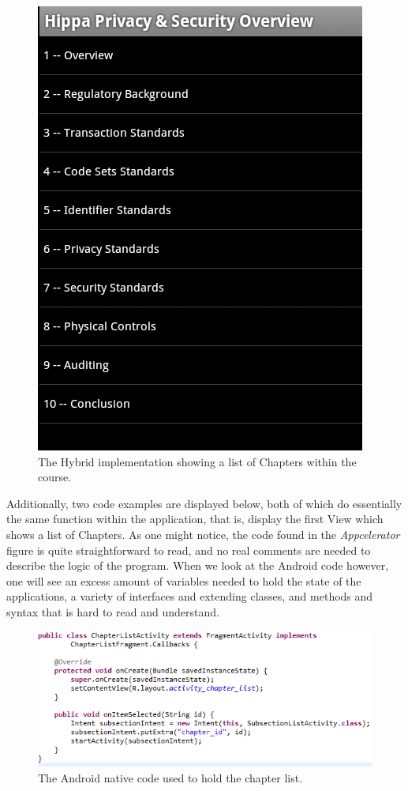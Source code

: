 \documentclass[11pt, twocolumn]{article}
\begin{document}
\begin{figure}[h!]
\includegraphics[scale=0.4]{appcelerator-chapter-implementation}
\caption{The Hybrid implementation showing a list of Chapters within the course.}
\end{figure}

Additionally, two code examples are displayed below, both of which do essentially the same function within the application, that is, display the first View which shows a list of Chapters.  As one might notice, the code found in the {\it Appcelerator} figure is quite straightforward to read, and no real comments are needed to describe the logic of the program.  When we look at the Android code however, one will see an excess amount of variables needed to hold the state of the applications, a variety of interfaces and extending classes, and methods and syntax that is hard to read and understand.

\begin{figure}[h!]
\includegraphics[scale=0.62]{android-chapter-list-code}
\caption{The Android native code used to hold the chapter list.}
\end{figure}
\end{document}
